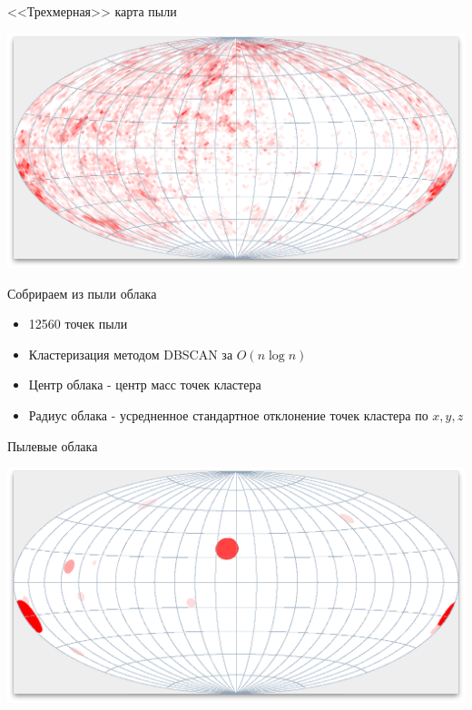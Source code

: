 \documentclass[14pt, fleqn, xcolor={dvipsnames, table}]{beamer}
\begin{document}
        \begin{frame}{<<Трехмерная>> карта пыли}
            \begin{center}
                \includegraphics[scale=0.32]{dust-3d.png}
            \end{center}             
        \end{frame}   
        
        \begin{frame}{Собрираем из пыли облака}
            \begin{itemize}
            		\item 12560 точек пыли
            		\item Кластеризация методом DBSCAN за $O(n \log n)$
            		\item Центр облака - центр масс точек кластера
            		\item Радиус облака - усредненное стандартное отклонение точек кластера по $x, y, z$
			\end{itemize}                   
        \end{frame}   
        
        \begin{frame}{Пылевые облака}
            \begin{center}
                \includegraphics[scale=0.32]{clouds-3d.png}
            \end{center}             
        \end{frame}  
        
\end{document}
